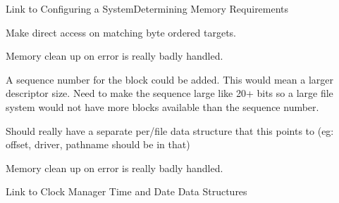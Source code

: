 \begin{DoxyRefList}
\label{todo__todo000005}%
%
Link to Configuring a System\+Determining Memory Requirements 
\item[File \mbox{\hyperlink{rtems-rfs-data_8h}{rtems-\/rfs-\/data.h}} ]\label{todo__todo000002}%
%
Make direct access on matching byte ordered targets.  
\item[Global \mbox{\hyperlink{flashdisk_8c_a022ec64c159cca53eb0023002f06816b}{rtems\+\_\+fdisk\+\_\+initialize}} (rtems\+\_\+device\+\_\+major\+\_\+number major, rtems\+\_\+device\+\_\+minor\+\_\+number minor, void $\ast$arg R\+T\+E\+M\+S\+\_\+\+U\+N\+U\+S\+ED)]\label{todo__todo000012}%
%
Memory clean up on error is really badly handled. 
\item[Global \mbox{\hyperlink{flashdisk_8c_ad5426c3ca9614ed541e80bca3d43366c}{rtems\+\_\+fdisk\+\_\+page\+\_\+desc}} ]\label{todo__todo000009}%
%
A sequence number for the block could be added. This would mean a larger descriptor size. Need to make the sequence large like 20+ bits so a large file system would not have more blocks available than the sequence number.  
\item[Class \mbox{\hyperlink{structrtems__libio__tt}{rtems\+\_\+libio\+\_\+tt}} ]\label{todo__todo000001}%
%
Should really have a separate per/file data structure that this points to (eg\+: offset, driver, pathname should be in that)  
\item[Global \mbox{\hyperlink{nvdisk_8c_abe720bfb2bdbaffc6fa1f31520259505}{rtems\+\_\+nvdisk\+\_\+initialize}} (rtems\+\_\+device\+\_\+major\+\_\+number major R\+T\+E\+M\+S\+\_\+\+U\+N\+U\+S\+ED, rtems\+\_\+device\+\_\+minor\+\_\+number minor R\+T\+E\+M\+S\+\_\+\+U\+N\+U\+S\+ED, void $\ast$arg R\+T\+E\+M\+S\+\_\+\+U\+N\+U\+S\+ED)]\label{todo__todo000013}%
%
Memory clean up on error is really badly handled. 
\item[Module \mbox{\hyperlink{group__RTEMSAPIClassic}{R\+T\+E\+M\+S\+A\+P\+I\+Classic}} ]\label{todo__todo000006}%
%
Link to Clock Manager Time and Date Data Structures
\end{DoxyRefList}